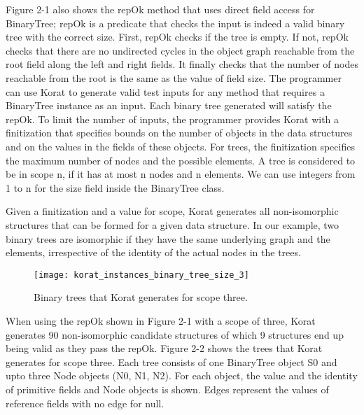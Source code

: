 \par
Figure 2-1 also shows the repOk method that uses direct field access for BinaryTree; repOk is a predicate that checks the input is indeed a valid binary tree with the correct size. First, repOk checks if the tree is empty. If not, repOk checks that there are no undirected cycles in the object graph reachable from the root field along the left and right fields. It finally checks that the number of nodes reachable from the root is the same as the value of field size. The programmer can use Korat to generate valid test inputs for any method that requires a BinaryTree instance as an input. Each binary tree generated will satisfy the repOk. To limit the number of inputs, the programmer provides Korat with a finitization that specifies bounds on the number of objects in the data structures and on the values in the fields of these objects. For trees, the finitization specifies the maximum number of nodes and the possible elements. A tree is considered to be in scope n, if it has at most n nodes and n elements. We can use integers from 1 to n for the size field inside the BinaryTree class.

\par
Given a finitization and a value for scope, Korat generates all non-isomorphic structures that can be formed for a given data structure. In our example, two binary trees are isomorphic if they have the same underlying graph and the elements, irrespective of the identity of the actual nodes in the trees. 

\begin{figure}
\centering
\texttt{[image: korat\_instances\_binary\_tree\_size\_3]}
\label{fig:btreeKoratGenScopeThree}
\caption{Binary trees that Korat generates for scope three.}
\end{figure}

\par
When using the repOk shown in Figure 2-1 with a scope of three, Korat generates 90 non-isomorphic candidate structures of which 9 structures end up being valid as they pass the repOk. Figure 2-2 shows the trees that Korat generates for scope three. Each tree consists of one BinaryTree object S0 and upto three Node objects (N0, N1, N2). For each object, the value and the identity of primitive fields and Node objects is shown. Edges represent the values of reference fields with no edge for null.

